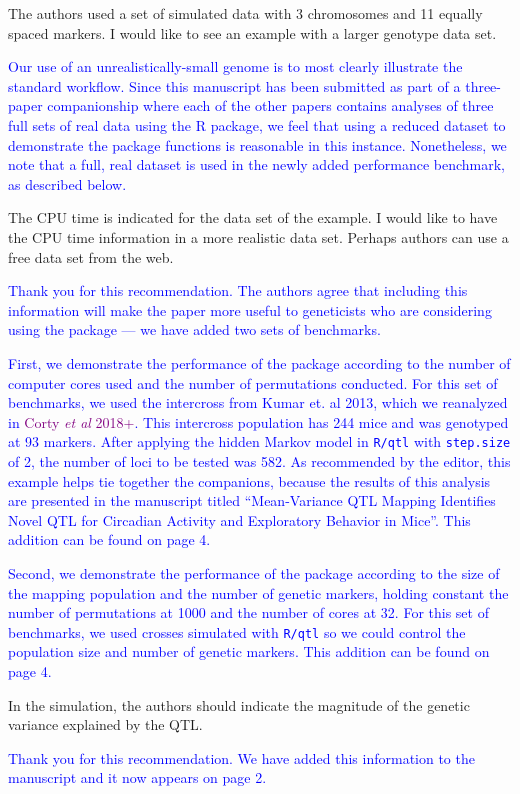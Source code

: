 \documentclass[11pt]{article}
\newcommand{\CortyReanalysisPaper}{\textcolor{purple}{Corty \emph{et al} 2018+}\xspace}
\newcommand{\ReviewerQuestion}[1]{
  \vspace{5pt}\goodbreak
  \noindent\fbox{Reviewer:} #1
  \normalfont\par
}
\newcommand{\Response}[1]{
  \goodbreak
  \textcolor{blue}{#1}
  \normalfont\par
}
\begin{document}
\ReviewerQuestion{
  The authors used a set of simulated data with 3 chromosomes and 11 equally spaced markers.
  I would like to see an example with a larger genotype data set.
}
\Response{
    Our use of an unrealistically-small genome is to most clearly illustrate the standard workflow.
    Since this manuscript has been submitted as part of a three-paper companionship where each of the other papers contains analyses of three full sets of real data using the R package, we feel that using a reduced dataset to demonstrate the package functions is reasonable in this instance.
    Nonetheless, we note that a full, real dataset is used in the newly added performance benchmark, as described below.
}


\ReviewerQuestion{
  The CPU time is indicated for the data set of the example.
  I would like to have the CPU time information in a more realistic data set.
  Perhaps authors can use a free data set from the web.
}
\Response{
  Thank you for this recommendation.
  The authors agree that including this information will make the paper more useful to geneticists who are considering using the package --- we have added two sets of benchmarks.
}
\Response{
  First, we demonstrate the performance of the package according to the number of computer cores used and the number of permutations conducted.
  For this set of benchmarks, we used the intercross from Kumar et. al 2013, which we reanalyzed in \CortyReanalysisPaper.
  This intercross population has 244 mice and was genotyped at 93 markers.
  After applying the hidden Markov model in \texttt{R/qtl} with \texttt{step.size} of 2, the number of loci to be tested was 582.
  As recommended by the editor, this example helps tie together the companions, because the results of this analysis are presented in the manuscript titled ``Mean-Variance QTL Mapping Identifies Novel QTL for Circadian Activity and Exploratory Behavior in Mice''.
  This addition can be found on page 4.
}
\Response{
  Second, we demonstrate the performance of the package according to the size of the mapping population and the number of genetic markers, holding constant the number of permutations at 1000 and the number of cores at 32.
  For this set of benchmarks, we used crosses simulated with \texttt{R/qtl} so we could control the population size and number of genetic markers.
  This addition can be found on page 4.
}

\ReviewerQuestion{
  In the simulation, the authors should indicate the magnitude of the genetic variance explained by the QTL.
}
\Response{
  Thank you for this recommendation.
  We have added this information to the manuscript and it now appears on page 2.
}
\end{document}
